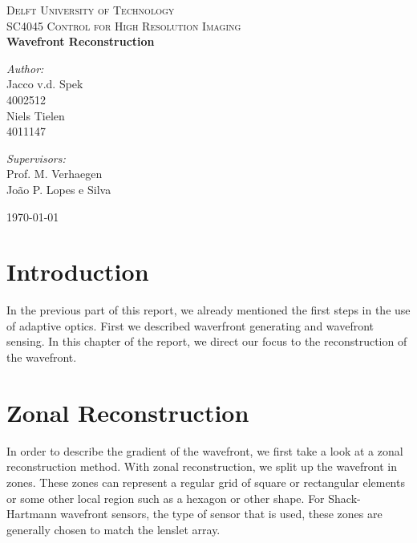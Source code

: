 \documentclass{article}
\begin{document}
\begin{titlepage}
\begin{center}

\textsc{\LARGE Delft University of Technology}\\[1.5cm]
\textsc{ SC4045 Control for High Resolution Imaging}\\[0.5cm]

{\huge\bfseries Wavefront Reconstruction \\[0.4cm] }

\begin{minipage}{0.4\textwidth}
\begin{flushleft} \large
\emph{Author:}\\
Jacco v.d. Spek \\
4002512 \\
Niels Tielen \\
4011147

\end{flushleft}
\end{minipage}
\begin{minipage}{0.4\textwidth}
\begin{flushright} \large
\emph{Supervisors:} \\
Prof. M. Verhaegen \\
João P. Lopes e Silva  
\end{flushright}
\end{minipage}

\vfill
{\large \today}
\end{center}
\end{titlepage}

\section*{Introduction}

In the previous part of this report, we already mentioned the first steps in the use of adaptive optics. First we described waverfront generating and wavefront sensing. In this chapter of the report, we direct our focus to the reconstruction of the wavefront. 

\section{Zonal Reconstruction}
In order to describe the gradient of the wavefront, we first take a look at a zonal reconstruction method. With zonal reconstruction, we split up the wavefront in zones. These zones can represent a regular grid of square or rectangular elements or some other local region such as a hexagon or other shape. For Shack-Hartmann wavefront sensors, the type of sensor that is used, these zones are generally chosen to match the lenslet array.
\end{document}
